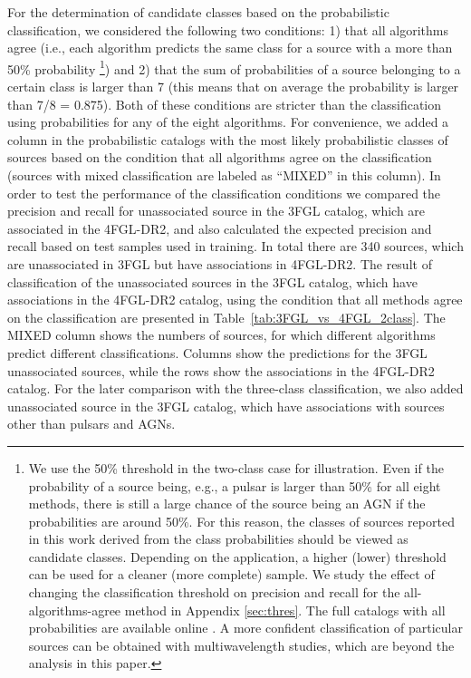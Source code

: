 \documentclass[referee]{aa} %
\begin{document}
For the determination of candidate classes based on the probabilistic classification, we considered the following two conditions:
1) that all algorithms agree (i.e., each algorithm predicts the same class for a source with a more than 50\% probability%
\footnote{We use the 50\% threshold in the two-class case for illustration. Even if the probability of a source being, e.g., a pulsar is larger than 50\% for all eight methods, there is still a large chance of the source being an AGN if the probabilities are around 50\%. 
For this reason, the classes of sources reported in this work derived from the class probabilities should be viewed as candidate classes.
Depending on the application, a higher (lower) threshold can be used for a cleaner (more complete) sample. 
We study the effect of changing the classification threshold on precision and recall for the all-algorithms-agree method in 
Appendix \ref{sec:thres}.
The full catalogs with all probabilities are available online \citep{SOM_material}.
A more confident classification of particular sources can be obtained with multiwavelength studies, 
which are beyond the analysis in this paper.}) and 
2) that the sum of probabilities of a source belonging to a certain class is larger than 7 
(this means that on average the probability is larger than 7/8 = 0.875).
Both of these conditions are stricter than the classification using probabilities for any of the eight algorithms.
For convenience, we added a column in the probabilistic catalogs with the most likely probabilistic classes of sources based on the condition that all algorithms agree on the classification (sources with mixed classification are labeled as ``MIXED'' in this column).
In order to test the performance of the classification conditions we compared the precision and recall for unassociated source in the 3FGL catalog, 
which are associated in the 4FGL-DR2, and also calculated the expected precision and recall based on test samples used in training.
In total there are 340 sources, which are unassociated in 3FGL but have associations in 4FGL-DR2.
The result of classification of the unassociated sources in the 3FGL catalog, which have associations in the 4FGL-DR2 catalog, 
using the condition that all methods agree on the classification are presented in Table~\ref{tab:3FGL_vs_4FGL_2class}.
The MIXED column shows the numbers of sources, for which different algorithms predict different classifications.
Columns show the predictions for the 3FGL unassociated sources, while the rows show the associations in the 4FGL-DR2 catalog.
For the later comparison with the three-class classification, we also added unassociated source in the 3FGL catalog, 
which have associations with sources other than pulsars and AGNs.
\end{document}
